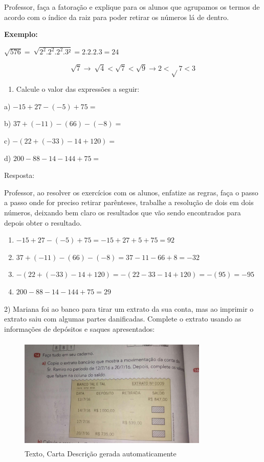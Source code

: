 Professor, faça a fatoração e explique para os alunos que agrupamos os
termos de acordo com o índice da raiz para poder retirar os números lá
de dentro.

\textbf{Exemplo:}

\(\sqrt{576} = \ \sqrt{2^{2}.2^{2}.2^{2}.3²} = 2.2.2.3 = 24\)

\[\sqrt{7} \rightarrow \ \sqrt{4} < \sqrt{7} < \sqrt{9} \rightarrow 2 < \sqrt{}7 < 3\]



\begin{enumerate}
\def\labelenumi{\arabic{enumi})}
\tightlist
\item
  Calcule o valor das expressões a seguir:
\end{enumerate}

a) \(- 15 + 27 - \left( - 5 \right) + 75 =\)

b) \(37 + \left( - 11 \right) - \left( 66 \right) - ( - 8) =\)

c) \(- (22 + \left( - 33 \right) - 14 + 120) =\)

d) \(200 - 88 - 14 - 144 + 75 =\)

Resposta:

Professor, ao resolver os exercícios com os alunos, enfatize as regras,
faça o passo a passo onde for preciso retirar parênteses, trabalhe a
resolução de dois em dois números, deixando bem claro os resultados que
vão sendo encontrados para depois obter o resultado.

\begin{enumerate}
\def\labelenumi{\alph{enumi})}
\item
  \(- 15 + 27 - \left( - 5 \right) + 75 = - 15 + 27 + 5 + 75 = 92\)
\item
  \(37 + \left( - 11 \right) - \left( 66 \right) - \left( - 8 \right) = 37 - 11 - 66 + 8 = - 32\)
\item
  \(- \left( 22 + \left( - 33 \right) - 14 + 120 \right) = - \left( 22 - 33 - 14 + 120 \right) = - \left( 95 \right) = - 95\)
\item
  \(200 - 88 - 14 - 144 + 75 = 29\)
\end{enumerate}

2) Mariana foi ao banco para tirar um extrato da sua conta, mas ao
imprimir o extrato saiu com algumas partes danificadas. Complete o
extrato usando as informações de depósitos e saques apresentados:

\begin{figure}
\centering
\includegraphics[width=3.54698in,height=2.14059in]{./imgSAEB_7_MAT/media/image2.jpg}
\caption{Texto, Carta Descrição gerada automaticamente}
\end{figure}

